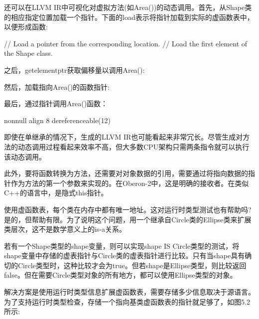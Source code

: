 还可以在LLVM IR中可视化对虚拟方法(如Area())的动态调用。首先，从Shape类的相应指定位置加载一个指针。下面的load表示将指针加载到实际的虚函数表中，以便形成函数:

\begin{shell}
// Load a pointer from the corresponding location.
// Load the first element of the Shape class.
\end{shell}

之后，getelementptr获取偏移量以调用Area():

\begin{shell}
\end{shell}

然后，加载指向Area()的函数指针:

\begin{shell}
\end{shell}

最后，通过指针调用Area()函数：

\begin{shell}
  nonnull align 8 dereferenceable(12) %
\end{shell}

即使在单继承的情况下，生成的LLVM IR也可能看起来非常冗长。尽管生成对方法的动态调用过程看起来效率不高，但大多数CPU架构只需两条指令就可以执行该动态调用。

此外，要将函数转换为方法，还需要对对象数据的引用，需要通过将指向数据的指针作为方法的第一个参数来实现的。在Oberon-2中，这是明确的接收者。在类似C++的语言中，是隐式this指针。

使用虚函数表，每个类在内存中都有唯一地址。这对运行时类型测试也有帮助吗?是的，但帮助有限。为了说明这个问题，用一个继承自Circle类的Ellipse类来扩展类层次，这不是数学意义上的is-a关系。

若有一个Shape类型的shape变量，则可以实现shape IS Circle类型的测试，将shape变量中存储的虚表指针与Circle类的虚表指针进行比较。只有当shape具有确切的Circle类型时，这种比较才会为true。但若shape是Ellipse类型，则比较返回false。但在需要Circle类型对象的所有地方，都可以使用Ellipse类型的对象。

解决方案是使用运行时类型信息扩展虚函数表，需要存储多少信息取决于源语言。为了支持运行时类型检查，存储一个指向基类虚函数表的指针就足够了，如图5.2所示:


